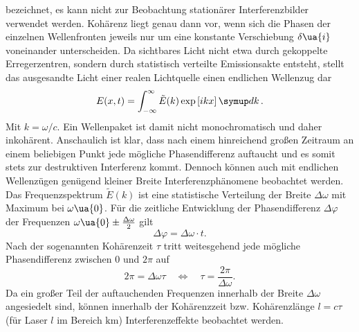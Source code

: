 bezeichnet, es kann nicht zur Beobachtung stationärer Interferenzbilder verwendet werden. Kohärenz liegt genau dann vor, wenn sich die Phasen
der einzelnen Wellenfronten jeweils nur um eine konstante Verschiebung $\delta\ua{i}$ voneinander unterscheiden.
Da sichtbares Licht nicht etwa durch gekoppelte Erregerzentren, sondern durch statistisch verteilte Emissionsakte entsteht,
stellt das ausgesandte Licht einer realen Lichtquelle einen endlichen Wellenzug dar
\begin{equation}
  E(x, t) = \int_{-\infty}^{\infty}\tilde{E}(k)\exp\left[ikx \right]\dif{k}.
\end{equation}
Mit $k = \omega/c$.
Ein Wellenpaket ist damit nicht monochromatisch und daher inkohärent. Anschaulich ist klar, dass nach einem hinreichend großen Zeitraum
an einem beliebigen Punkt jede mögliche Phasendifferenz auftaucht und es somit stets zur destruktiven Interferenz kommt. Dennoch
können auch mit endlichen Wellenzügen genügend kleiner Breite Interferenzphänomene beobachtet werden. Das Frequenzspektrum $\tilde{E}(k)$
ist eine statistische Verteilung der Breite $\Delta \omega$ mit Maximum bei $\omega\ua{0}$.
Für die zeitliche Entwicklung der Phasendifferenz $\Delta \varphi$ der Frequenzen $\omega\ua{0} \pm \frac{\Delta \omega }{2}$ gilt
\begin{equation}
  \Delta \varphi = \Delta \omega \cdot t.
\end{equation}
Nach der sogenannten Kohärenzeit $\tau$ tritt weitesgehend jede mögliche Phasendifferenz zwischen $0$ und $2\pi$ auf
\begin{equation}
  2\pi = \Delta \omega \tau \quad \Leftrightarrow \quad \tau = \frac{2\pi}{\Delta \omega}.
\end{equation}
Da ein großer Teil der auftauchenden Frequenzen innerhalb der Breite $\Delta \omega$ angesiedelt sind, können innerhalb der Kohärenzzeit
bzw. Kohärenzlänge $l = c \tau$ (für Laser $l$ im Bereich $\si{\kilo\meter}$) Interferenzeffekte beobachtet werden.

